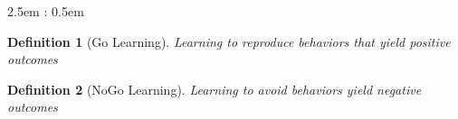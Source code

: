 \usepackage{amsthm}

\makeatletter
{}%
{\topsep}{\topsep}
{\normalfont}{2.5em}
{\bfseries}{:}
{0.5em}
{}
\makeatother

\theoremstyle{defstyle}
\newtheorem*{defn}{Definition} %



\begin{defn}[Go Learning]
	Learning to reproduce behaviors that yield \textit{positive} outcomes
\end{defn}

\begin{defn}[NoGo Learning]
	Learning to avoid behaviors yield \textit{negative} outcomes
\end{defn}
